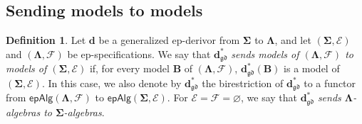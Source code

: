 \documentclass{amsart}
\theoremstyle{plain}
\theoremstyle{definition}
\newtheorem{definition}[theorem]{Definition}
\begin{document}
\subsection{Sending models to models}\label{SEpModels}

\begin{definition}\label{DSendsModels}
Let $\mathbf{d}$ be a generalized ep-derivor from $\mathbf{\Sigma}$ to $\mathbf{\Lambda}$, and let $(\mathbf{\Sigma},\mathcal{E})$ and $(\mathbf{\Lambda},\mathcal{F})$ be ep-specifications. We say that $\mathbf{d}^{\ast}_{\mathfrak{gd}}$ \emph{sends models of $(\mathbf{\Lambda},\mathcal{F})$ to models of $(\mathbf{\Sigma},\mathcal{E})$} if, for every model $\mathbf{B}$ of $(\mathbf{\Lambda},\mathcal{F})$, $\mathbf{d}^{\ast}_{\mathfrak{gd}}(\mathbf{B})$ is a model of $(\mathbf{\Sigma},\mathcal{E})$. In this case, we also denote by $\mathbf{d}^{\ast}_{\mathfrak{gd}}$ the birestriction of $\mathbf{d}^{\ast}_{\mathfrak{gd}}$ to a functor from $\mathsf{epAlg}(\mathbf{\Lambda},\mathcal{F})$ to $\mathsf{epAlg}(\mathbf{\Sigma},\mathcal{E})$. For $\mathcal{E}=\mathcal{F}=\varnothing$, we say that $\mathbf{d}^{\ast}_{\mathfrak{gd}}$ \emph{sends $\mathbf{\Lambda}$-algebras to $\mathbf{\Sigma}$-algebras}.
\end{definition}
\end{document}
